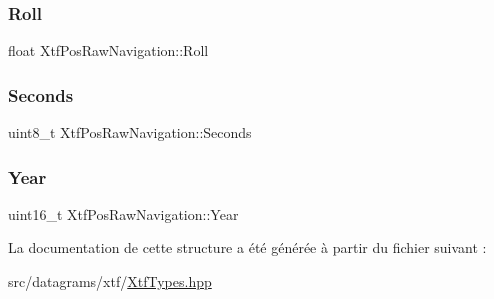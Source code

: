 \subsubsection{\texorpdfstring{Roll}{Roll}}
{\footnotesize\ttfamily float Xtf\+Pos\+Raw\+Navigation\+::\+Roll}

\mbox{\label{structXtfPosRawNavigation_a937a58d418bc71b387192b164a2f494e}} 
\subsubsection{\texorpdfstring{Seconds}{Seconds}}
{\footnotesize\ttfamily uint8\+\_\+t Xtf\+Pos\+Raw\+Navigation\+::\+Seconds}

\mbox{\label{structXtfPosRawNavigation_a2e0d32b5ebb8153b10b8865aadcbfc6a}} 
\subsubsection{\texorpdfstring{Year}{Year}}
{\footnotesize\ttfamily uint16\+\_\+t Xtf\+Pos\+Raw\+Navigation\+::\+Year}



La documentation de cette structure a été générée à partir du fichier suivant \+:\begin{DoxyCompactItemize}
\item 
src/datagrams/xtf/\hyperlink{XtfTypes_8hpp}{Xtf\+Types.\+hpp}\end{DoxyCompactItemize}
